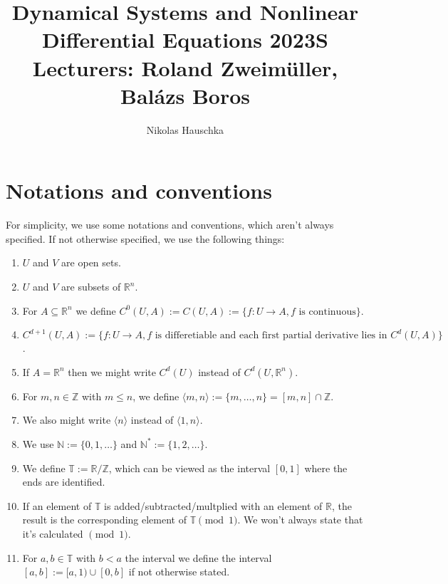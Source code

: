 \documentclass{article}
\title{Dynamical Systems and Nonlinear Differential Equations 2023S \\
Lecturers: Roland Zweimüller, Balázs Boros}
\author{Nikolas Hauschka}
\date{}
\newcommand*{\N}{\mathbb{N}}
\newcommand*{\Z}{\mathbb{Z}}
\newcommand*{\R}{\mathbb{R}}
\newcommand*{\T}{\mathbb{T}}
\newcommand*{\Ns}{\N^*}
\newcommand*{\Rn}{{\mathbb{R}^n}}
\newcommand*{\jbr}[1]{{\langle #1 \rangle}}
\begin{document}
\maketitle
\tableofcontents

\setcounter{section}{-1}

\section{Notations and conventions}

For simplicity, we use some notations and conventions, which aren't always specified. If not otherwise specified, we use the following things:

\begin{enumerate}
    \item $U$ and $V$ are open sets.

    \item $U$ and $V$ are subsets of $\Rn$.

    \item For $A \subseteq \Rn$ we define $C^0(U,A) := C(U,A) := \{f:U \to A, f \text{ is continuous}\}$.

    \item $C^{d+1}(U,A) := \{f:U\to A, f \text{ is differetiable and each first partial derivative lies in } C^d(U,A)\}$.

    \item If $A = \Rn$ then we might write $C^d(U)$ instead of $C^d(U,\Rn)$.

    \item For $m,n\in\Z$ with $m\leq n$, we define $\jbr{m,n}:=\{m,\dots,n\}=[m,n]\cap\Z$.

    \item We also might write $\jbr{n}$ instead of $\jbr{1,n}$.

    \item We use $\N := \{0,1,\dots\}$ and $\Ns:=\{1,2,\dots\}$.

    \item We define $\T := \R / \Z$, which can be viewed as the interval $[0,1]$ where the ends are identified.

    \item If an element of $\T$ is added/subtracted/multplied with an element of $\R$, the result is the corresponding element of $\T \pmod1$. We won't always state that it's calculated $\pmod1$.

    \item For $a,b \in \T$ with $b<a$ the interval we define the interval $[a,b] := [a,1) \cup [0,b]$ if not otherwise stated.
\end{enumerate}
\end{document}
